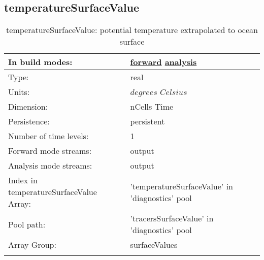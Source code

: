 \subsection[temperatureSurfaceValue]{temperatureSurfaceValue}
\label{subsec:var_sec_diagnostics_temperatureSurfaceValue}
\begin{center}
\begin{longtable}{| p{2.0in} | p{4.0in} |}
        \hline 
        In build modes: & \hyperref[subsec:forward_var_tab_diagnostics]{forward} \hyperref[subsec:analysis_var_tab_diagnostics]{analysis} \\
        \hline 
        Type: & real \\
        \hline 
        Units: & $degrees$ $Celsius$ \\
        \hline 
        Dimension: & nCells Time \\
        \hline 
        Persistence: & persistent \\
        \hline 
        Number of time levels: & 1 \\
        \hline 
		 Forward mode streams: &  output \\
        \hline 
		 Analysis mode streams: &  output \\
        \hline 
		 Index in temperatureSurfaceValue Array: & 'temperatureSurfaceValue' in 'diagnostics' pool \\
		 \hline 
            Pool path: & 'tracersSurfaceValue' in 'diagnostics' pool
 \\
		 \hline 
		 Array Group: & surfaceValues \\
		 \hline 
    \caption{temperatureSurfaceValue: potential temperature extrapolated to ocean surface}
\end{longtable}
\end{center}
